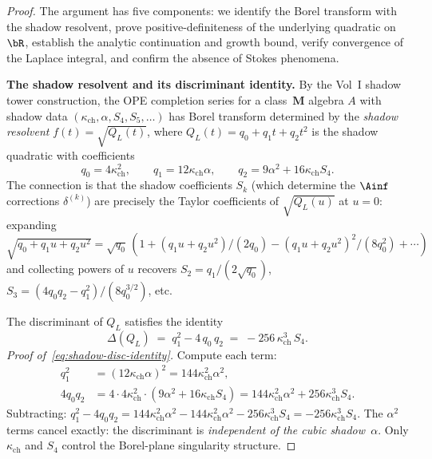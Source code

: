\begin{proof}
The argument has five components: we identify the Borel transform with the shadow resolvent, prove positive-definiteness of the underlying quadratic on~$\bR$, establish the analytic continuation and growth bound, verify convergence of the Laplace integral, and confirm the absence of Stokes phenomena.

\smallskip\noindent\textbf{The shadow resolvent and its discriminant identity.}
By the Vol~I shadow tower construction, the OPE completion series for a class~$\mathbf{M}$ algebra $A$ with shadow data $(\kappa_{\mathrm{ch}}, \alpha, S_4, S_5, \ldots)$ has Borel transform determined by the \emph{shadow resolvent} $f(t) = \sqrt{Q_L(t)}$, where $Q_L(t) = q_0 + q_1 t + q_2 t^2$ is the shadow quadratic with coefficients
\[
 q_0 = 4\kappa_{\mathrm{ch}}^2, \qquad q_1 = 12\kappa_{\mathrm{ch}}\alpha, \qquad q_2 = 9\alpha^2 + 16\kappa_{\mathrm{ch}} S_4.
\]
The connection is that the shadow coefficients $S_k$ (which determine the $\Ainf$ corrections $\delta^{(k)}$) are precisely the Taylor coefficients of $\sqrt{Q_L(u)}$ at $u = 0$: expanding $\sqrt{q_0 + q_1 u + q_2 u^2} = \sqrt{q_0}\,(1 + (q_1 u + q_2 u^2)/(2q_0) - (q_1 u + q_2 u^2)^2/(8q_0^2) + \cdots)$ and collecting powers of $u$ recovers $S_2 = q_1/(2\sqrt{q_0})$, $S_3 = (4q_0 q_2 - q_1^2)/(8q_0^{3/2})$, etc.

The discriminant of $Q_L$ satisfies the identity
\begin{equation}
\label{eq:shadow-disc-identity}
 \Delta(Q_L) \;=\; q_1^2 - 4\,q_0\,q_2 \;=\; -256\,\kappa_{\mathrm{ch}}^3\, S_4.
\end{equation}
\emph{Proof of~\eqref{eq:shadow-disc-identity}.} Compute each term:
\begin{align*}
 q_1^2 &= (12\kappa_{\mathrm{ch}} \alpha)^2 = 144\kappa_{\mathrm{ch}}^2 \alpha^2, \\
 4 q_0 q_2 &= 4 \cdot 4\kappa_{\mathrm{ch}}^2 \cdot (9\alpha^2 + 16\kappa_{\mathrm{ch}} S_4) = 144\kappa_{\mathrm{ch}}^2 \alpha^2 + 256\kappa_{\mathrm{ch}}^3 S_4.
\end{align*}
Subtracting: $q_1^2 - 4 q_0 q_2 = 144\kappa_{\mathrm{ch}}^2 \alpha^2 - 144\kappa_{\mathrm{ch}}^2 \alpha^2 - 256\kappa_{\mathrm{ch}}^3 S_4 = -256\kappa_{\mathrm{ch}}^3 S_4$. The $\alpha^2$ terms cancel exactly: the discriminant is \emph{independent of the cubic shadow~$\alpha$}. Only $\kappa_{\mathrm{ch}}$ and $S_4$ control the Borel-plane singularity structure.


\end{proof}
